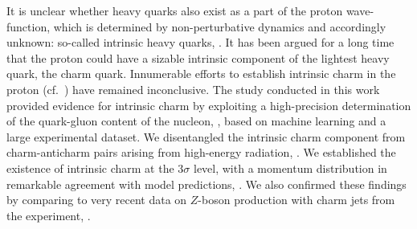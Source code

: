 
It is unclear whether heavy quarks also exist as a part of the proton
wave-function, which is determined by non-perturbative dynamics and accordingly
unknown: so-called intrinsic heavy quarks, \cite{Brodsky:1980pb}.
It has been argued for a long time that the proton could have a sizable
intrinsic component of the lightest  heavy quark, the charm quark. Innumerable
efforts to establish intrinsic charm in the proton (cf.\
\cite{Brodsky:2015fna}) have remained inconclusive.
%
The study conducted in this work provided evidence for intrinsic charm by
exploiting a high-precision determination of the quark-gluon content of the
nucleon, \cite{Ball:2021leu}, based on machine learning and a large
experimental dataset.
%
We disentangled the intrinsic charm component from charm-anticharm pairs
arising from high-energy radiation, \cite{Ball:2015tna}.
We established the existence of intrinsic charm at the  $3\sigma$ level, with a
momentum distribution in remarkable agreement with model predictions,
\cite{Brodsky:1980pb,Hobbs:2013bia}.
%
We also confirmed these findings by comparing to very recent data on $Z$-boson
production with charm jets from the \lhcb experiment, \cite{LHCb:2021stx}. 
